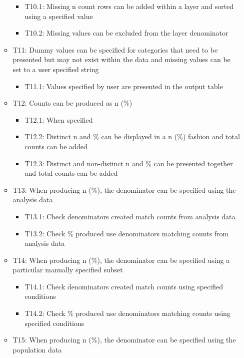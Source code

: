 \documentclass[
]{article}
\providecommand{\tightlist}{%
  \setlength{\itemsep}{0pt}\setlength{\parskip}{0pt}}
\begin{document}
\begin{itemize}
\begin{itemize}
    \begin{itemize}
    \tightlist
    \item
      T10.1: Missing n count rows can be added within a layer and sorted
      using a specified value
    \item
      T10.2: Missing values can be excluded from the layer denominator
    \end{itemize}
  \item
    T11: Dummy values can be specified for categories that need to be
    presented but may not exist within the data and missing values can
    be set to a user specified string

    \begin{itemize}
    \tightlist
    \item
      T11.1: Values specified by user are presented in the output table
    \end{itemize}
  \item
    T12: Counts can be produced as n (\%)

    \begin{itemize}
    \tightlist
    \item
      T12.1: When specified
    \item
      T12.2: Distinct n and \% can be displayed in a n (\%) fashion and
      total counts can be added
    \item
      T12.3: Distinct and non-distinct n and \% can be presented
      together and total counts can be added
    \end{itemize}
  \item
    T13: When producing n (\%), the denominator can be specified using
    the analysis data

    \begin{itemize}
    \tightlist
    \item
      T13.1: Check denominators created match counts from analysis data
    \item
      T13.2: Check \% produced use denominators matching counts from
      analysis data
    \end{itemize}
  \item
    T14: When producing n (\%), the denominator can be specified using a
    particular manually specified subset

    \begin{itemize}
    \tightlist
    \item
      T14.1: Check denominators created match counts using specified
      conditions
    \item
      T14.2: Check \% produced use denominators matching counts using
      specified conditions
    \end{itemize}
  \item
    T15: When producing n (\%), the denominator can be specified using
    the population data


\end{itemize}
\end{itemize}
\end{document}
